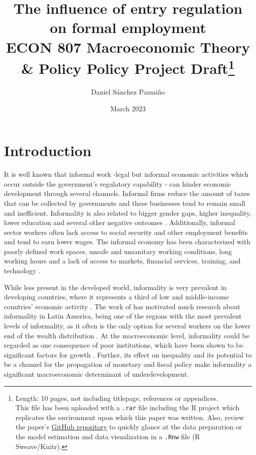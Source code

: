 \documentclass[11pt,a4paper]{article}\usepackage[]{graphicx}\usepackage[]{xcolor}
\title{The influence of entry regulation on formal employment \\[1em] 
\large{ECON 807 Macroeconomic Theory \& Policy Policy Project Draft}\footnote{
Length: 10 pages, not including titlepage, references or appendices. \\
This file has been uploaded with a \texttt{.rar} file including the R project which replicates the environment upon which this paper was written. Also, review the paper's \href{https://github.com/dsanchezp18/econ807-policy-project}{GitHub repository} to quickly glance at the data preparation or the model estimation and data visualization in a \texttt{.Rnw} file (R Sweave/Knitr).}}
\author{Daniel Sánchez Pazmiño}
\date{March 2023}
\begin{document}
\maketitle
\section{Introduction}

It is well known that informal work -legal but informal economic activities which occur outside the government's regulatory capability \parencite{Sassen.1994} - can hinder economic development through several channels. Informal firms reduce the amount of taxes that can be collected by governments and these businesses tend to remain small and inefficient. Informality is also related to bigger gender gaps, higher inequality, lower education and several other negative outcomes \parencite{Delechat2020}. Additionally, informal sector workers often lack access to social security and other employment benefits and tend to earn lower wages. The informal economy has been characterized with poorly defined work spaces, unsafe and unsanitary working conditions, long working hours and a lack of access to markets, financial services, training, and technology \parencite{IloND}. 

While less present in the developed world, informality is very prevalent in developing countries, where it represents a third of low and middle-income countries' economic activity \parencite{Delechat2020}. The work of \textcite{Soto.2002} has motivated much research about informality in Latin America, being one of the regions with the most prevalent levels of informality, as it often is the only option for several workers on the lower end of the wealth distribution \parencite{Oviedo.2009}. At the macroeconomic level, informality could be regarded as one consequence of poor institutions, which have been shown to be significant factors for growth \parencite{Acemoglu.2001, RafaelLaPorta.1997, Glaeser.2004}. Further, its effect on inequality and its potential to be a channel for the propagation of monetary and fiscal policy \parencite{Alberola.2020} make informality a significant macroeconomic determinant of underdevelopment.
\end{document}

